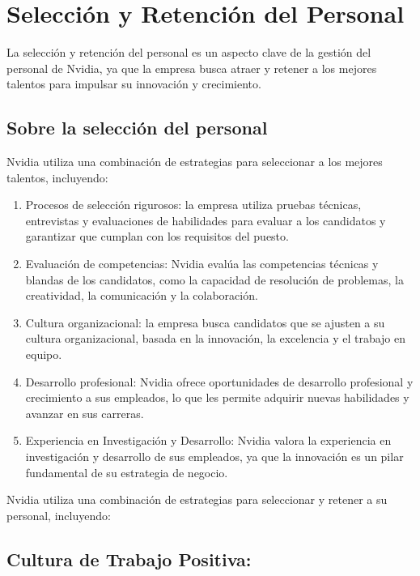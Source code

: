 \documentclass{article}
\begin{document}
\newpage

\section{Selección y Retención del Personal}
 
La selección y retención del personal es un aspecto clave de la gestión del personal de Nvidia, ya que la empresa busca atraer y retener a los mejores talentos para impulsar su innovación y crecimiento.

\subsection{Sobre la selección del personal}

Nvidia utiliza una combinación de estrategias para seleccionar a los mejores talentos, incluyendo:

\begin{enumerate}
  \item Procesos de selección rigurosos: la empresa utiliza pruebas técnicas, entrevistas y evaluaciones de habilidades para evaluar a los candidatos y garantizar que cumplan con los requisitos del puesto.
  \item Evaluación de competencias: Nvidia evalúa las competencias técnicas y blandas de los candidatos, como la capacidad de resolución de problemas, la creatividad, la comunicación y la colaboración.
  \item Cultura organizacional: la empresa busca candidatos que se ajusten a su cultura organizacional, basada en la innovación, la excelencia y el trabajo en equipo.
  \item Desarrollo profesional: Nvidia ofrece oportunidades de desarrollo profesional y crecimiento a sus empleados, lo que les permite adquirir nuevas habilidades y avanzar en sus carreras.
  \item Experiencia en Investigación y Desarrollo: Nvidia valora la experiencia en investigación y desarrollo de sus empleados, ya que la innovación es un pilar fundamental de su estrategia de negocio.
\end{enumerate}

Nvidia utiliza una combinación de estrategias para seleccionar y retener a su personal, incluyendo:

\subsection{Cultura de Trabajo Positiva:}
\end{document}
